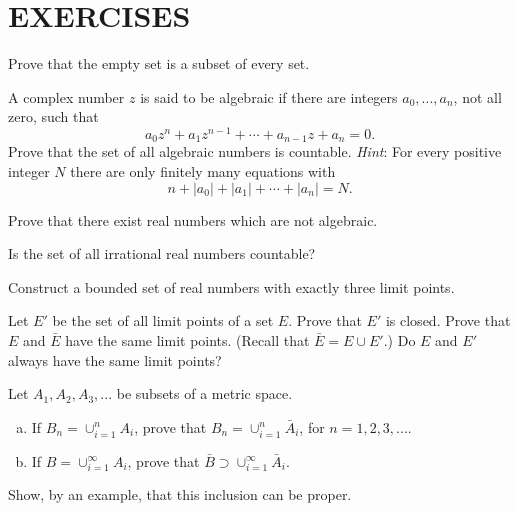 
\section*{EXERCISES}

\begin{myExercise}
    \label{ex:2.1}
    Prove that the empty set is a subset of every set.
\end{myExercise}

\begin{myExercise}
    \label{ex:2.2}
    A complex number $z$ is said to be algebraic 
    if there are integers $a_0, ... , a_n$, not all
    zero, such that
    \begin{equation*}
        a_{0} z^{n} 
        + a_{1} z^{n-1}
        +\cdots
        + a_{n-1} z
        + a_n = 0 .
    \end{equation*}
    Prove that the set of all algebraic numbers is countable. 
    \emph{Hint}: For every positive integer $N$ 
    there are only finitely many equations with
    \begin{equation*}
        n 
        + |a_0|
        + |a_1|
        + \cdots
        + |a_n| = N .
    \end{equation*}
\end{myExercise}

\begin{myExercise}
    \label{ex:2.3}
    Prove that there exist real numbers which are not algebraic.
\end{myExercise}

\begin{myExercise}
    \label{ex:2.4}
    Is the set of all irrational real numbers countable?
\end{myExercise}

\begin{myExercise}
    \label{ex:2.5}
    Construct a bounded set of real numbers with exactly three limit points.
\end{myExercise}

\begin{myExercise}
    \label{ex:2.6}
    Let $E'$ be the set of all limit points of a set $E$. 
    Prove that $E'$ is closed. 
    Prove that $E$ and $\bar{E}$ have the same limit points. 
    (Recall that $\bar{E} = E \cup E'$.) 
    Do $E$ and $E'$ always have the same limit points?
\end{myExercise}

\begin{myExercise}
    \label{ex:2.7}
    Let $A_1, A_2, A_3, ...$ be subsets of a metric space.
    \begin{enumerate}[(a)]
        \item If $B_n = \cup_{i=1}^n A_i$, 
        prove that $B_n = \cup_{i=1}^n \bar{A}_i$, 
        for $n = 1, 2, 3, ...$.
        \item If $B = \cup_{i=1}^{\infty} A_i$, 
        prove that $\bar{B} \supset \cup_{i=1}^{\infty}\bar{A}_i$.
    \end{enumerate}
    Show, by an example, that this inclusion can be proper.
\end{myExercise}

